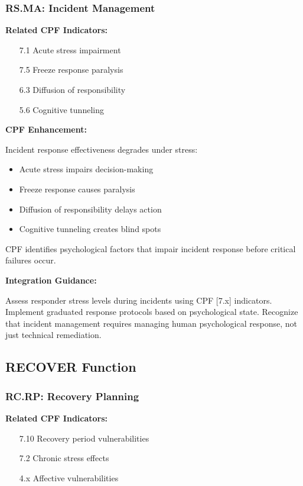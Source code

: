 \documentclass[11pt,a4paper]{article}
\begin{document}
\subsubsection{RS.MA: Incident Management}

\textbf{Related CPF Indicators:}
\begin{itemize}
\item [7.1] Acute stress impairment
\item [7.5] Freeze response paralysis
\item [6.3] Diffusion of responsibility
\item [5.6] Cognitive tunneling
\end{itemize}

\textbf{CPF Enhancement:}

Incident response effectiveness degrades under stress:

\begin{itemize}
\item Acute stress impairs decision-making
\item Freeze response causes paralysis
\item Diffusion of responsibility delays action
\item Cognitive tunneling creates blind spots
\end{itemize}

CPF identifies psychological factors that impair incident response before critical failures occur.

\textbf{Integration Guidance:}

Assess responder stress levels during incidents using CPF [7.x] indicators. Implement graduated response protocols based on psychological state. Recognize that incident management requires managing human psychological response, not just technical remediation.

\subsection{RECOVER Function}

\subsubsection{RC.RP: Recovery Planning}

\textbf{Related CPF Indicators:}
\begin{itemize}
\item [7.10] Recovery period vulnerabilities
\item [7.2] Chronic stress effects
\item [4.x] Affective vulnerabilities
\end{itemize}
\end{document}
